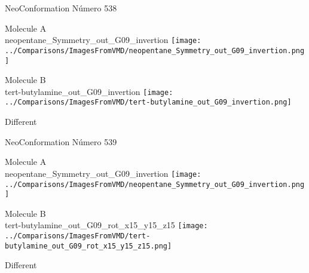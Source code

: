  \newpage

\vtab[-3cm]
\begin{center}
{\large NeoConformation \tab Número 538}
\end{center}
\begin{multicols}{2}
\begin{center}
Molecule A \\ 
neopentane\_Symmetry\_out\_G09\_invertion
\texttt{[image: ../Comparisons/ImagesFromVMD/neopentane\_Symmetry\_out\_G09\_invertion.png]}
\\
\vtab

\columnbreak
Molecule B \\ 
tert-butylamine\_out\_G09\_invertion
\texttt{[image: ../Comparisons/ImagesFromVMD/tert-butylamine\_out\_G09\_invertion.png]}
\\
\vtab


\end{center}
\end{multicols}
\begin{center}
\textcolor{NavyBlue}{\Large Different}
\end{center}

 \newpage

\vtab[-3cm]
\begin{center}
{\large NeoConformation \tab Número 539}
\end{center}
\begin{multicols}{2}
\begin{center}
Molecule A \\ 
neopentane\_Symmetry\_out\_G09\_invertion
\texttt{[image: ../Comparisons/ImagesFromVMD/neopentane\_Symmetry\_out\_G09\_invertion.png]}
\\
\vtab

\columnbreak
Molecule B \\ 
tert-butylamine\_out\_G09\_rot\_x15\_y15\_z15
\texttt{[image: ../Comparisons/ImagesFromVMD/tert-butylamine\_out\_G09\_rot\_x15\_y15\_z15.png]}
\\
\vtab


\end{center}
\end{multicols}
\begin{center}
\textcolor{NavyBlue}{\Large Different}
\end{center}

 \newpage

